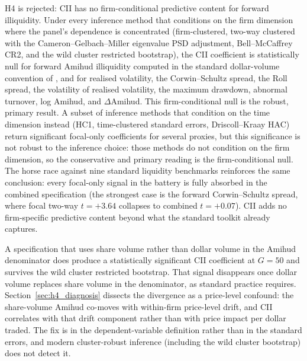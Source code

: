 \documentclass[preprint,12pt,authoryear]{elsarticle}
\begin{document}
H4 is rejected: CII has no firm-conditional predictive content for forward illiquidity. Under every inference method that conditions on the firm dimension where the panel's dependence is concentrated (firm-clustered, two-way clustered with the Cameron--Gelbach--Miller eigenvalue PSD adjustment, Bell--McCaffrey CR2, and the wild cluster restricted bootstrap), the CII coefficient is statistically null for forward Amihud illiquidity computed in the standard dollar-volume convention of \citet{amihud2002illiquidity}, and for realised volatility, the Corwin--Schultz spread, the Roll spread, the volatility of realised volatility, the maximum drawdown, abnormal turnover, log Amihud, and $\Delta$Amihud. This firm-conditional null is the robust, primary result. A subset of inference methods that condition on the time dimension instead (HC1, time-clustered standard errors, Driscoll--Kraay HAC) return significant focal-only coefficients for several proxies, but this significance is not robust to the inference choice: those methods do not condition on the firm dimension, so the conservative and primary reading is the firm-conditional null. The horse race against nine standard liquidity benchmarks reinforces the same conclusion: every focal-only signal in the battery is fully absorbed in the combined specification (the strongest case is the forward Corwin--Schultz spread, where focal two-way $t = +3.64$ collapses to combined $t = +0.07$). CII adds no firm-specific predictive content beyond what the standard toolkit already captures.

A specification that uses share volume rather than dollar volume in the Amihud denominator does produce a statistically significant CII coefficient at $G = 50$ and survives the wild cluster restricted bootstrap. That signal disappears once dollar volume replaces share volume in the denominator, as standard practice requires. Section~\ref{sec:h4_diagnosis} dissects the divergence as a price-level confound: the share-volume Amihud co-moves with within-firm price-level drift, and CII correlates with that drift component rather than with price impact per dollar traded. The fix is in the dependent-variable definition rather than in the standard errors, and modern cluster-robust inference (including the wild cluster bootstrap) does not detect it.
\end{document}
